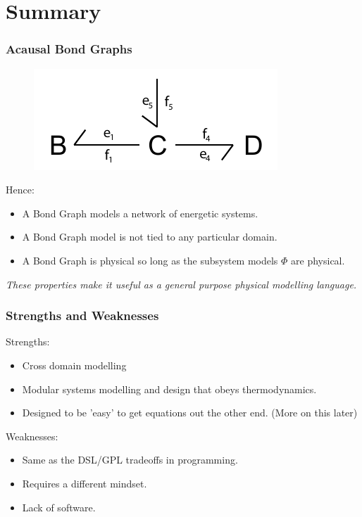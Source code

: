 \documentclass[11pt,reqno]{beamer}
\begin{document}
\section{Summary}
\begin{frame}
\frametitle{Acausal Bond Graphs}
	\begin{figure}
	\includegraphics{images/bondgraph.pdf}
\end{figure}
Hence:
\begin{itemize}
	\item A Bond Graph models a network of energetic systems.
	\item A Bond Graph model is not tied to any particular domain.
	\item A Bond Graph is physical so long as the subsystem models $\Phi$ are physical.
\end{itemize}
\emph{These properties make it useful as a general purpose physical modelling language.}
\end{frame}
\begin{frame}
\frametitle{Strengths and Weaknesses}
Strengths:
\begin{itemize}
	\item Cross domain modelling
	\item Modular systems modelling and design that obeys thermodynamics.
	\item Designed to be 'easy' to get equations out the other end. (More on this later)	
\end{itemize}
Weaknesses:
\begin{itemize}
	\item Same as the DSL/GPL tradeoffs in programming.
	\item Requires a different mindset.
	\item Lack of software.
\end{itemize}
\end{frame}
\end{document}

